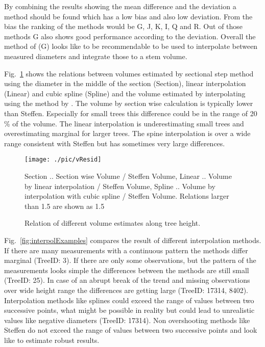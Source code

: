 \documentclass[twocolumn]{scrartcl}
\begin{document}
By combining the results showing the mean difference and the deviation a method
should be found which has a low bias and also low deviation. From the bias the
ranking of the methods would be G, J, K, I, Q and R. Out of those methods G also
shows good performance according to the deviation. Overall the method of
\cite{steffen1990interpolation} (G) looks like to be recommendable to be used to
interpolate between measured diameters and integrate those to a stem volume.

Fig.~\ref{fig:vResid} shows the relations between volumes estimated by sectional
step method using the diameter in the middle of the section (Section), linear
interpolation (Linear) and cubic spline (Spline) and the volume estimated by
interpolating using the method by \cite{steffen1990interpolation}. The volume by
section wise calculation is typically lower than Steffen. Especially for small
trees this difference could be in the range of 20\,\% of the volume. The linear
interpolation is underestimating small trees and overestimating marginal for
larger trees. The spine interpolation is over a wide range consistent with
Steffen but has sometimes very large differences.

\begin{figure}[htbp]
  \centering
  \texttt{[image: ./pic/vResid]}
  \caption{Relation of different volume estimates along tree height.}
  \label{fig:vResid}
  \footnotesize{Section .. Section wise Volume / Steffen Volume, Linear ..
  Volume by linear interpolation / Steffen Volume, Spline .. Volume by
  interpolation with cubic spline / Steffen Volume. Relations larger than 1.5
  are shown as 1.5}
\end{figure}

Fig.~\ref{fig:interpolExamples} compares the result of different interpolation
methods. If there are many measurements with a continuous pattern the methods
differ marginal (TreeID: 3). If there are only some observations, but the
pattern of the measurements looks simple the differences between the methods are
still small (TreeID: 25). In case of an abrupt break of the trend and missing
observations over wide height range the differences are getting large (TreeID:
17314, 8402). Interpolation methods like splines could exceed the range of
values between two successive points, what might be possible in reality but
could lead to unrealistic values like negative diameters (TreeID: 17314). Non
overshooting methods like Steffen do not exceed the range of values between two
successive points and look like to estimate robust results.
\end{document}
